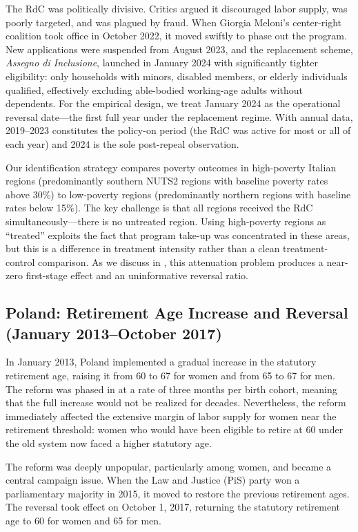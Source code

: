 \documentclass[12pt]{article}
\begin{document}
The RdC was politically divisive. Critics argued it discouraged labor supply, was poorly targeted, and was plagued by fraud. When Giorgia Meloni's center-right coalition took office in October 2022, it moved swiftly to phase out the program. New applications were suspended from August 2023, and the replacement scheme, \textit{Assegno di Inclusione}, launched in January 2024 with significantly tighter eligibility: only households with minors, disabled members, or elderly individuals qualified, effectively excluding able-bodied working-age adults without dependents. For the empirical design, we treat January 2024 as the operational reversal date---the first full year under the replacement regime. With annual data, 2019--2023 constitutes the policy-on period (the RdC was active for most or all of each year) and 2024 is the sole post-repeal observation.

Our identification strategy compares poverty outcomes in high-poverty Italian regions (predominantly southern NUTS2 regions with baseline poverty rates above 30\%) to low-poverty regions (predominantly northern regions with baseline rates below 15\%). The key challenge is that all regions received the RdC simultaneously---there is no untreated region. Using high-poverty regions as ``treated'' exploits the fact that program take-up was concentrated in these areas, but this is a difference in treatment intensity rather than a clean treatment-control comparison. As we discuss in , this attenuation problem produces a near-zero first-stage effect and an uninformative reversal ratio.

\subsection{Poland: Retirement Age Increase and Reversal (January 2013--October 2017)}

In January 2013, Poland implemented a gradual increase in the statutory retirement age, raising it from 60 to 67 for women and from 65 to 67 for men. The reform was phased in at a rate of three months per birth cohort, meaning that the full increase would not be realized for decades. Nevertheless, the reform immediately affected the extensive margin of labor supply for women near the retirement threshold: women who would have been eligible to retire at 60 under the old system now faced a higher statutory age.

The reform was deeply unpopular, particularly among women, and became a central campaign issue. When the Law and Justice (PiS) party won a parliamentary majority in 2015, it moved to restore the previous retirement ages. The reversal took effect on October 1, 2017, returning the statutory retirement age to 60 for women and 65 for men.
\end{document}
